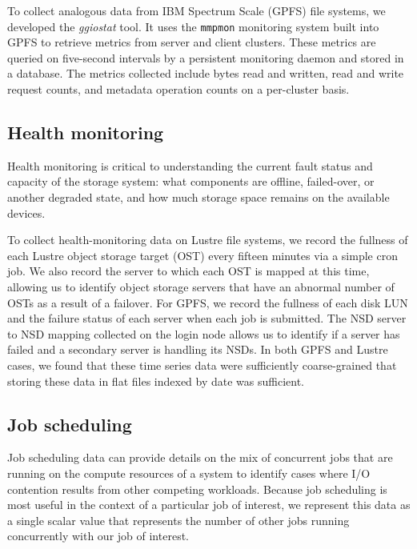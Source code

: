 \label{sec:methods/ggiostat}
To collect analogous data from IBM Spectrum Scale (GPFS) file systems, we developed the \emph{ggiostat} tool.
It uses the \texttt{mmpmon} monitoring system built into GPFS to retrieve metrics from server and client clusters.
These metrics are queried on five-second intervals by a persistent monitoring daemon and stored in a database.
The metrics collected include bytes read and written, read and write request counts, and metadata operation counts on a per-cluster basis.

\subsection{Health monitoring} \label{sec:methods/health}

Health monitoring is critical to understanding the current fault status and capacity of the
storage system: what components are offline, failed-over, or another degraded state, and how much storage space remains on the available devices.

To collect health-monitoring data on Lustre file systems, we record the fullness of each Lustre object storage target (OST) every fifteen minutes via a simple cron job.
We also record the server to which each OST is mapped at this time, allowing us to identify object storage servers that have an abnormal number of OSTs as a result of a failover.
For GPFS, we record the fullness of each disk LUN and the failure status of each server when each job is submitted.
The NSD server to NSD mapping collected on the login node allows us to identify if a server has failed and a secondary server is handling its NSDs.
In both GPFS and Lustre cases, we found that these time series data were sufficiently coarse-grained that storing these data in flat files indexed by date was sufficient.

\subsection{Job scheduling} \label{sec:methods/scheduling}

Job scheduling data can provide details on the mix of concurrent jobs that are running on the compute resources of a system to identify cases where I/O contention results from other competing workloads.
Because job scheduling is most useful in the context of a particular job of interest, we represent this data as a single scalar value that represents the number of other jobs running concurrently with our job of interest.

